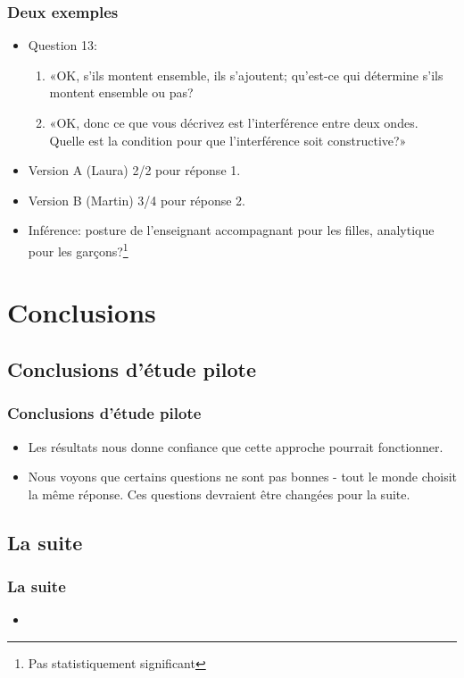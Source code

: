 \documentclass{beamer}
\begin{document}
\begin{frame}
  \frametitle{Deux exemples}
  \begin{itemize}
  \item Question 13:
    \begin{enumerate}
    \item «OK, s’ils montent ensemble, ils s’ajoutent; qu’est-ce qui détermine
      s’ils montent ensemble ou pas?
    \item «OK, donc ce que vous décrivez est l’interférence entre deux ondes.
      Quelle est la condition pour que l’interférence soit constructive?»   
      \end{enumerate}
  \item Version A (Laura) 2/2 pour réponse 1.
  \item Version B (Martin) 3/4 pour réponse 2.
  \item Inférence: posture de l'enseignant accompagnant pour les filles,
    analytique pour les garçons?\footnote{Pas statistiquement significant} 
  \end{itemize}
\end{frame}


\section{Conclusions}
\subsection{Conclusions d'étude pilote}
\begin{frame}
\frametitle{Conclusions d'étude pilote}
  \begin{itemize}
  \item Les résultats nous donne confiance que cette approche pourrait fonctionner.
  \item Nous voyons que certains questions ne sont pas bonnes - tout le monde
    choisit la même réponse. Ces questions devraient être changées pour la suite.
  \end{itemize}
\end{frame}

\subsection{La suite}
\begin{frame}
  \frametitle{La suite}
  \begin{itemize}
  \item   
  \end{itemize}
\end{frame}
\end{document}
